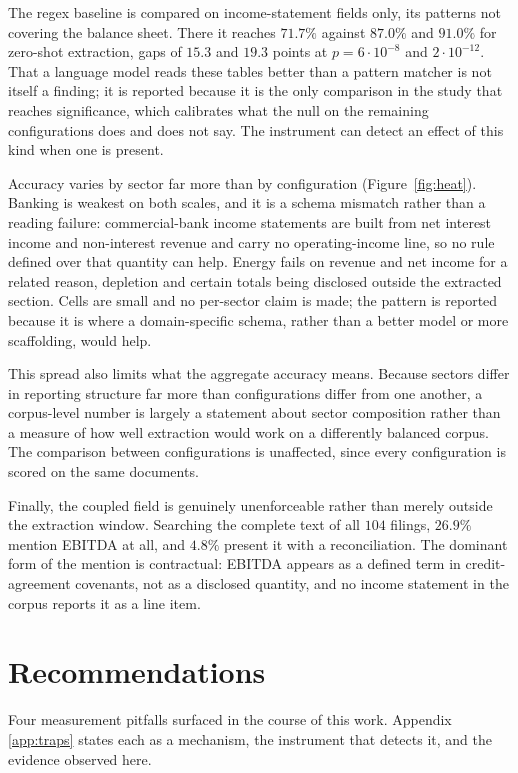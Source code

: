 \documentclass[11pt]{article}
\begin{document}
The regex baseline is compared on income-statement fields only, its patterns not
covering the balance sheet. There it reaches $71.7\%$ against $87.0\%$ and $91.0\%$ for
zero-shot extraction, gaps of $15.3$ and $19.3$ points at $p = 6{\cdot}10^{-8}$ and
$2{\cdot}10^{-12}$. That a language model reads these tables better than a pattern
matcher is not itself a finding; it is reported because it is the only comparison in the
study that reaches significance, which calibrates what the null on the remaining
configurations does and does not say. The instrument can detect an effect of this kind
when one is present.

Accuracy varies by sector far more than by configuration (Figure~\ref{fig:heat}).
Banking is weakest on both scales, and it is a schema mismatch rather than a reading
failure: commercial-bank income statements are built from net interest income and
non-interest revenue and carry no operating-income line, so no rule defined over that
quantity can help. Energy fails on revenue and net income for a related reason,
depletion and certain totals being disclosed outside the extracted section. Cells are
small and no per-sector claim is made; the pattern is reported because it is where a
domain-specific schema, rather than a better model or more scaffolding, would help.

This spread also limits what the aggregate accuracy means. Because sectors differ in
reporting structure far more than configurations differ from one another, a
corpus-level number is largely a statement about sector composition rather than a
measure of how well extraction would work on a differently balanced corpus. The
comparison between
configurations is unaffected, since every configuration is scored on the same documents.

Finally, the coupled field is genuinely unenforceable rather than merely outside the
extraction window. Searching the complete text of all $104$ filings, $26.9\%$ mention
EBITDA at all, and $4.8\%$ present it with a reconciliation. The dominant form of the
mention is contractual: EBITDA appears as a defined term in credit-agreement covenants,
not as a disclosed quantity, and no income statement in the corpus reports it as a line
item.

\section{Recommendations}
\label{sec:traps}

Four measurement pitfalls surfaced in the course of this work. Appendix
\ref{app:traps} states each as a mechanism, the instrument that detects it, and the
evidence observed here.
\end{document}
